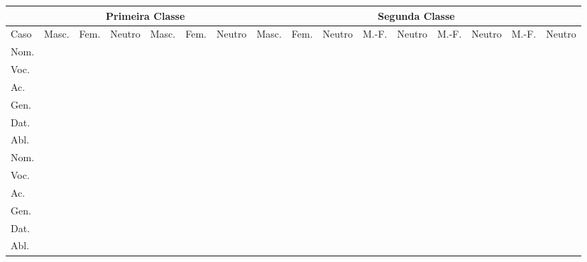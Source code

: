 \documentclass[12pt, oneside, a4paper, article]{article}
\begin{document}
\begin{landscape}
\begin{table}
\begin{tabular}[!ht]
{|l||p{1.4cm}|p{1.4cm}|p{1.4cm}||p{1.4cm}|p{1.4cm}|p{1.4cm}||p{1.4cm}|p{1.4cm}|p{1.4cm}||p{1.4cm}|p{1.4cm}||p{1.1cm}|p{1.1cm}||p{1.1cm}|p{1.1cm}|} 
\hline \hline
& \multicolumn{6}{c||}{Primeira Classe} & \multicolumn{9}{c|}{Segunda Classe} \\
\hline
Caso & Masc. & Fem. & Neutro & Masc. & Fem. & Neutro & Masc. & Fem. & Neutro & M.-F. & Neutro & M.-F. & Neutro & M.-F. & Neutro
\\
\hline
Nom. & & & & & & & & & & & & \multicolumn{2}{p{2cm}||}{} & \multicolumn{2}{p{2cm}|}{} \\ \hline
Voc. & & & & & & & & & & & & \multicolumn{2}{p{2cm}||}{} & \multicolumn{2}{p{2cm}|}{} \\ \hline
Ac.  & & & & & & & & & & & & & & & \\ \hline
Gen. & & & & & & & & & & & & \multicolumn{2}{p{2cm}||}{} & \multicolumn{2}{p{2cm}|}{} \\ \hline
Dat. & & & & & & & & & & & & \multicolumn{2}{p{2cm}||}{} & \multicolumn{2}{p{2cm}|}{} \\ \hline
Abl. & & & & & & & & & & & & \multicolumn{2}{p{2cm}||}{} & \multicolumn{2}{p{2cm}|}{} \\ 
\hline \hline                             
Nom. & & & & & & & & & & & & & & & \\ \hline
Voc. & & & & & & & & & & & & & & & \\ \hline
Ac.  & & & & & & & & & & & & & & & \\ \hline
Gen. & & & & & & & & & & & & \multicolumn{2}{p{2cm}||}{} & \multicolumn{2}{p{2cm}|}{} \\ \hline
Dat. & & & & & & & & & & & & \multicolumn{2}{p{2cm}||}{} & \multicolumn{2}{p{2cm}|}{} \\ \hline
Abl. & & & & & & & & & & & & \multicolumn{2}{p{2cm}||}{} & \multicolumn{2}{p{2cm}|}{} \\ 
\hline \hline
\end{tabular}
\end{table}
\end{landscape}

\end{document}
